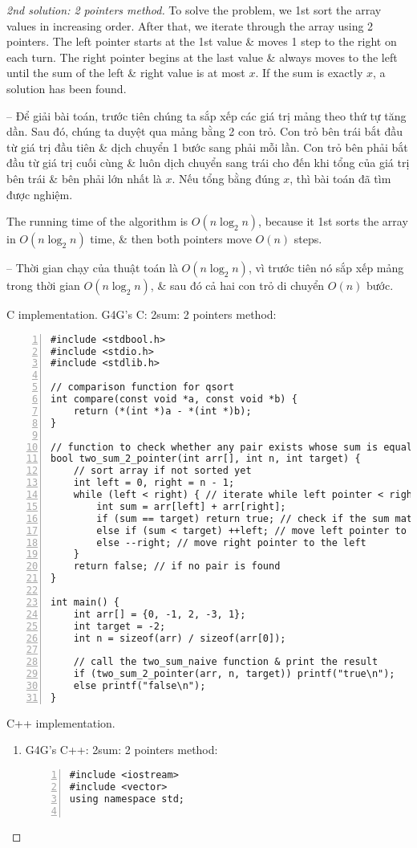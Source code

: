 \documentclass{article}
\begin{document}
\begin{proof}[2nd solution: 2 pointers method]
    To solve the problem, we 1st sort the array values in increasing order. After that, we iterate through the array using 2 pointers. The left pointer starts at the 1st value \& moves 1 step to the right on each turn. The right pointer begins at the last value \& always moves to the left until the sum of the left \& right value is at most $x$. If the sum is exactly $x$, a solution has been found.

    -- Để giải bài toán, trước tiên chúng ta sắp xếp các giá trị mảng theo thứ tự tăng dần. Sau đó, chúng ta duyệt qua mảng bằng 2 con trỏ. Con trỏ bên trái bắt đầu từ giá trị đầu tiên \& dịch chuyển 1 bước sang phải mỗi lần. Con trỏ bên phải bắt đầu từ giá trị cuối cùng \& luôn dịch chuyển sang trái cho đến khi tổng của giá trị bên trái \& bên phải lớn nhất là $x$. Nếu tổng bằng đúng $x$, thì bài toán đã tìm được nghiệm.

    The running time of the algorithm is $O(n\log_2n)$, because it 1st sorts the array in $O(n\log_2n)$ time, \& then both pointers move $O(n)$ steps.

    -- Thời gian chạy của thuật toán là $O(n\log_2n)$, vì trước tiên nó sắp xếp mảng trong thời gian $O(n\log_2n)$, \& sau đó cả hai con trỏ di chuyển $O(n)$ bước.
    \item {\sf C implementation.} G4G's C: 2sum: 2 pointers method:
    \begin{Verbatim}[numbers=left,xleftmargin=5mm]
#include <stdbool.h>
#include <stdio.h>
#include <stdlib.h>

// comparison function for qsort
int compare(const void *a, const void *b) {
    return (*(int *)a - *(int *)b);
}

// function to check whether any pair exists whose sum is equal to the given target value
bool two_sum_2_pointer(int arr[], int n, int target) {
    // sort array if not sorted yet
    int left = 0, right = n - 1;
    while (left < right) { // iterate while left pointer < right pointer
        int sum = arr[left] + arr[right];
        if (sum == target) return true; // check if the sum matches the target
        else if (sum < target) ++left; // move left pointer to the right
        else --right; // move right pointer to the left
    }
    return false; // if no pair is found
}

int main() {
    int arr[] = {0, -1, 2, -3, 1};
    int target = -2;
    int n = sizeof(arr) / sizeof(arr[0]);

    // call the two_sum_naive function & print the result
    if (two_sum_2_pointer(arr, n, target)) printf("true\n");
    else printf("false\n");
}
    \end{Verbatim}
    \item {\sf C++ implementation.}
    \begin{enumerate}
        \item G4G's C++: 2sum: 2 pointers method:
        \begin{Verbatim}[numbers=left,xleftmargin=5mm]
#include <iostream>
#include <vector>
using namespace std;


\end{Verbatim}
\end{enumerate}
\end{proof}
\end{document}
